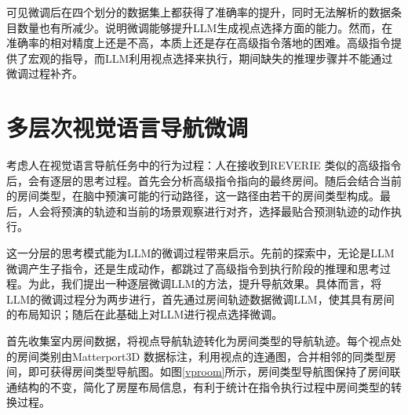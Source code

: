 \documentclass[bachelor]{thesis-uestc}
\begin{document}
    可见微调后在四个划分的数据集上都获得了准确率的提升，同时无法解析的数据条目数量也有所减少。说明微调能够提升LLM生成视点选择方面的能力。然而，在准确率的相对精度上还是不高，本质上还是存在高级指令落地的困难。高级指令提供了宏观的指导，而LLM利用视点选择来执行，期间缺失的推理步骤并不能通过微调过程补齐。


    \section{多层次视觉语言导航微调}

    考虑人在视觉语言导航任务中的行为过程：人在接收到REVERIE 类似的高级指令后，会有逐层的思考过程。首先会分析高级指令指向的最终房间。随后会结合当前的房间类型，在脑中预演可能的行动路径，这一路径由若干的房间类型构成。最后，人会将预演的轨迹和当前的场景观察进行对齐，选择最贴合预测轨迹的动作执行。

这一分层的思考模式能为LLM的微调过程带来启示。先前的探索中，无论是LLM微调产生子指令，还是生成动作，都跳过了高级指令到执行阶段的推理和思考过程。为此，我们提出一种逐层微调LLM的方法，提升导航效果。具体而言，将LLM的微调过程分为两步进行，首先通过房间轨迹数据微调LLM，使其具有房间的布局知识；随后在此基础上对LLM进行视点选择微调。

首先收集室内房间数据，将视点导航轨迹转化为房间类型的导航轨迹。每个视点处的房间类别由Matterport3D 数据标注，利用视点的连通图，合并相邻的同类型房间，即可获得房间类型导航图。如图\ref{vproom}所示，房间类型导航图保持了房间联通结构的不变，简化了房屋布局信息，有利于统计在指令执行过程中房间类型的转换过程。

\end{document}
